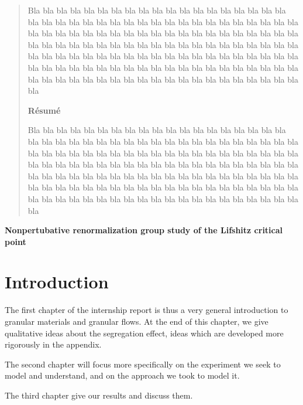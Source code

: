 \pagebreak 
{}
\begin{abstract}
Bla bla bla bla bla bla bla bla bla bla bla bla bla bla bla bla bla bla bla bla bla bla bla bla bla bla bla bla bla bla bla bla bla bla bla bla bla bla bla bla bla bla bla bla bla bla bla bla bla bla bla bla bla bla bla bla bla bla bla bla bla bla bla bla bla bla bla bla bla bla bla bla bla bla bla bla bla bla bla bla bla bla bla bla bla bla bla bla bla bla bla bla bla bla bla bla bla bla bla bla bla bla bla bla bla bla bla bla bla bla bla bla bla bla bla bla bla bla bla bla bla bla bla bla bla bla bla bla bla bla bla bla bla bla bla bla bla bla bla bla 

\begin{center}
\textbf{Résumé}
\end{center}
Bla bla bla bla bla bla bla bla bla bla bla bla bla bla bla bla bla bla bla bla bla bla bla bla bla bla bla bla bla bla bla bla bla bla bla bla bla bla bla bla bla bla bla bla bla bla bla bla bla bla bla bla bla bla bla bla bla bla bla bla bla bla bla bla bla bla bla bla bla bla bla bla bla bla bla bla bla bla bla bla bla bla bla bla bla bla bla bla bla bla bla bla bla bla bla bla bla bla bla bla bla bla bla bla bla bla bla bla bla bla bla bla bla bla bla bla bla bla bla bla bla bla bla bla bla bla bla bla bla bla bla bla bla bla bla bla bla bla bla bla 
\end{abstract}


\pagebreak

\begin{center}
\Huge \textbf{Nonpertubative renormalization group study of the Lifshitz critical point}
\end{center}


\section*{\Huge{Introduction}}

The first chapter of the internship report is thus a very general introduction to granular materials and granular flows. At the end of this chapter, we give qualitative ideas about the segregation effect, ideas which are developed more rigorously in the appendix.

The second chapter will focus more specifically on the experiment we seek to model and understand, and on the approach we took to model it.

The third chapter give our results and discuss them.

